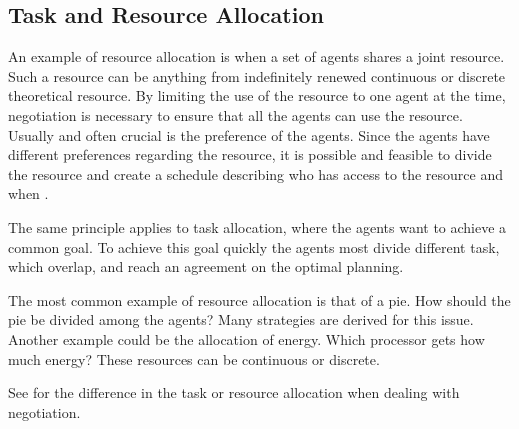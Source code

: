 \subsection{Task and Resource Allocation}
An example of resource allocation is when a set of agents shares a joint resource. Such a resource can be anything from indefinitely renewed continuous or discrete theoretical resource. By limiting the use of the resource to one agent at the time, negotiation is necessary to ensure that all the agents can use the resource. Usually and often crucial is the preference of the agents. Since the agents have different preferences regarding the resource, it is possible and feasible to divide the resource and create a schedule describing who has access to the resource and when \citep{fatima2014principles}. 

The same principle applies to task allocation, where the agents want to achieve a common goal. To achieve this goal quickly the agents most divide different task, which overlap, and reach an agreement on the optimal planning. 

The most common example of resource allocation is that of a pie. How should the pie be divided among the agents? Many strategies are derived for this issue. Another example could be the allocation of energy. Which processor gets how much energy? These resources can be continuous or discrete.

See  for the difference in the task or resource allocation when dealing with negotiation.

